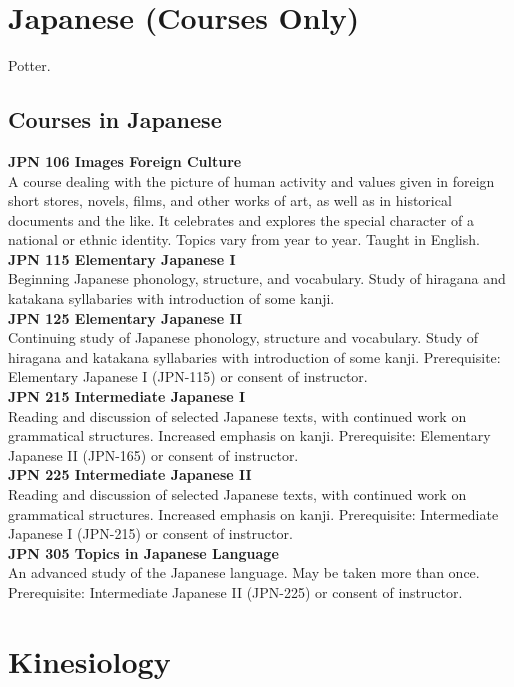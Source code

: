 \documentclass[
  letterpaper,
]{scrbook}
\begin{document}
\section{Japanese (Courses Only)}\label{sec-japanese}

Potter.

\subsection{Courses in Japanese}\label{courses-in-japanese}

\textbf{JPN 106 Images Foreign Culture}\\
A course dealing with the picture of human activity and values given in
foreign short stores, novels, films, and other works of art, as well as
in historical documents and the like. It celebrates and explores the
special character of a national or ethnic identity. Topics vary from
year to year. Taught in English.\\
\textbf{JPN 115 Elementary Japanese I}\\
Beginning Japanese phonology, structure, and vocabulary. Study of
hiragana and katakana syllabaries with introduction of some kanji.\\
\textbf{JPN 125 Elementary Japanese II}\\
Continuing study of Japanese phonology, structure and vocabulary. Study
of hiragana and katakana syllabaries with introduction of some kanji.
Prerequisite: Elementary Japanese I (JPN-115) or consent of
instructor.\\
\textbf{JPN 215 Intermediate Japanese I}\\
Reading and discussion of selected Japanese texts, with continued work
on grammatical structures. Increased emphasis on kanji. Prerequisite:
Elementary Japanese II (JPN-165) or consent of instructor.\\
\textbf{JPN 225 Intermediate Japanese II}\\
Reading and discussion of selected Japanese texts, with continued work
on grammatical structures. Increased emphasis on kanji. Prerequisite:
Intermediate Japanese I (JPN-215) or consent of instructor.\\
\textbf{JPN 305 Topics in Japanese Language}\\
An advanced study of the Japanese language. May be taken more than once.
Prerequisite: Intermediate Japanese II (JPN-225) or consent of
instructor.

\section{Kinesiology}\label{sec-kinesiology}
\end{document}
